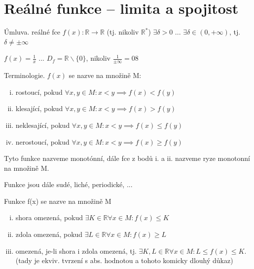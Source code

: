 \section{Reálné funkce -- limita a spojitost}

Úmluva. reálné fce $f(x): \mathbb R \rightarrow \mathbb R$ (tj. nikoliv $\mathbb R^*$)
        $\exists \delta > 0$ ... $\exists \delta \in (0, + \infty)$, tj. $\delta \neq \pm \infty$

\begin{priklad} $f(x) = \frac{1}{x}$ ... $D_f = \mathbb R \smallsetminus \{0\}$, nikoliv $\frac{1}{\pm \infty} = 0$8
\end{priklad}

Terminologie. $f(x)$ se nazve na množině M:
  \begin{enumerate}[i.]
    \item rostoucí, pokud $\forall x, y \in M: x<y \implies f(x) < f(y)$
    \item klesající, pokud $\forall x, y \in M: x<y \implies f(x) > f(y)$
    \item neklesající, pokud $\forall x, y \in M: x<y \implies f(x) \leq f(y)$
    \item nerostoucí, pokud $\forall x, y \in M: x<y \implies f(x) \geq f(y)$
  \end{enumerate}
  Tyto funkce nazveme monotónní, dále fce z bodů i. a ii. nazveme ryze monotonní na množině M.

Funkce jsou dále sudé, liché, periodické, ...

\begin{definice}
  Funkce f(x) se nazve na množině M
  \begin{enumerate}[i.]
    \item shora omezená, pokud $\exists K \in \mathbb R \forall x \in M: f(x) \leq K$
    \item zdola omezená, pokud $\exists L \in \mathbb R \forall x \in M: f(x) \geq L$
    \item omezená, je-li shora i zdola omezená, tj. $\exists K, L \in \mathbb R \forall x \in M: L \leq f(x) \leq K$. (tady je ekviv. tvrzení s abs. hodnotou a tohoto komicky dlouhý důkaz)
  \end{enumerate}
\end{definice}

